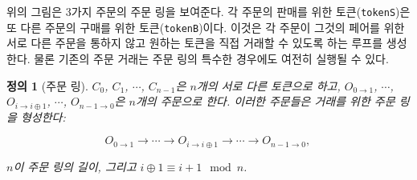 \documentclass{article}
\makeatletter
\newtheorem{definition}{정의}[section]
\newenvironment{figurehere}
{\def\@captype{figure}}
{}
\makeatother
\begin{document}
\begin{multicols}{2}
\begin{center}
\begin{figurehere}
		
\caption{3가지 주문의 주문 링}
		\label{fig:ring}
	\end{figurehere}

\end{center}

위의 그림은 3가지 주문의 주문 링을 보여준다. 각 주문의 판매를 위한 토큰(\verb|tokenS|)은 또 다른 주문의 구매를 위한 토큰(\verb|tokenB|)이다. 이것은 각 주문이 그것의 페어를 위한 서로 다른 주문을 통하지 않고 원하는 토큰을 직접 거래할 수 있도록 하는 루프를 생성한다. 물론 기존의 주문 거래는 주문 링의 특수한 경우에도 여전히 실행될 수 있다.

\begin{definition}[주문 링] $C_{0}$, $C_{1}$, $\cdots$, $C_{n-1}$은 $n$개의 서로 다른 토큰으로 하고, $O_{0\rightarrow 1}$, $\cdots$, $O_{i\rightarrow i\oplus 1}$, $\cdots$, $O_{n-1 \rightarrow 0}$은 $n$개의 주문으로 한다. 이러한 주문들은 거래를 위한 주문 링을 형성한다:

$$O_{0\rightarrow 1} \rightarrow \cdots \rightarrow O_{i\rightarrow i\oplus 1} \rightarrow \cdots \rightarrow O_{n-1\rightarrow 0} \text{, }$$

$n$이 주문 링의 길이, 그리고 $i\oplus 1 \equiv i+1 \mod n$.

\end{definition}


\end{multicols}
\end{document}
